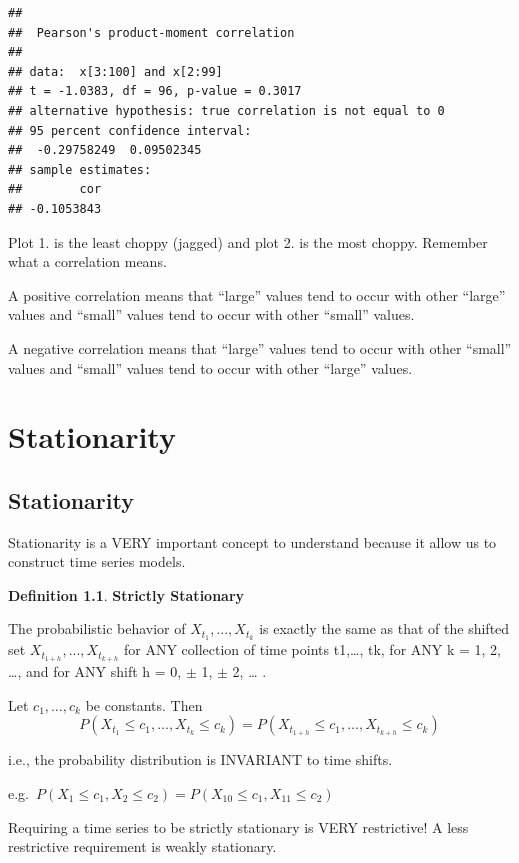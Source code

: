 \documentclass[
]{book}
\theoremstyle{definition}
\newtheorem{definition}{Definition}[chapter]
\theoremstyle{definition}
\theoremstyle{definition}
\theoremstyle{definition}
\theoremstyle{remark}
\begin{document}
\begin{verbatim}
## 
##  Pearson's product-moment correlation
## 
## data:  x[3:100] and x[2:99]
## t = -1.0383, df = 96, p-value = 0.3017
## alternative hypothesis: true correlation is not equal to 0
## 95 percent confidence interval:
##  -0.29758249  0.09502345
## sample estimates:
##        cor 
## -0.1053843
\end{verbatim}

Plot 1. is the least choppy (jagged) and plot 2. is the most choppy. Remember what a correlation means.

A positive correlation means that ``large'' values tend to occur with other ``large'' values and ``small'' values tend to occur with other ``small'' values.

A negative correlation means that ``large'' values tend to occur with other ``small'' values and ``small'' values tend to occur with other ``large'' values.

\hypertarget{stationarity}{%
\chapter{Stationarity}\label{stationarity}}

\hypertarget{stationarity-1}{%
\section{Stationarity}\label{stationarity-1}}

Stationarity is a VERY important concept to understand because it allow us to construct time series models.

\begin{definition}
\textbf{Strictly Stationary}

The probabilistic behavior of \(X_{t_1},...,X_{t_k}\) is exactly the same as that of the shifted set \(X_{t_{1+h}},...,X_{t_{k+h}}\) for ANY collection of time points t1,\ldots, tk, for ANY k = 1, 2, \ldots, and for ANY shift h = 0, \(\pm\) 1, \(\pm\) 2, \ldots{} .

Let \(c_1,…, c_k\) be constants. Then\[P(X_{t_1}\leq{c_1},...,X_{t_k}\leq{c_k})=P(X_{t_{1+h}}\leq{c_{1}},...,X_{t_{k+h}}\leq{c_k})\]

i.e., the probability distribution is INVARIANT to time shifts.
\end{definition}

e.g.~\(P(X_1\leq{c_1}, X_2\leq{c_2})=P(X_{10}\leq{c_1}, X_{11}\leq{c_2})\)

Requiring a time series to be strictly stationary is VERY restrictive! A less restrictive requirement is weakly stationary.
\end{document}
